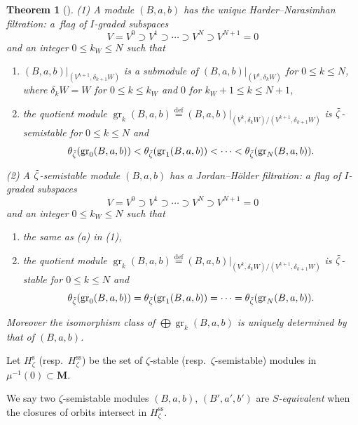 \documentclass[pdftex]{sigma}
\newenvironment{aenume}{%
  \begin{enumerate}%
  \renewcommand{\theenumi}{\alph{enumi}}%
  \renewcommand{\labelenumi}{\textup{(\theenumi)}}%
  }{\end{enumerate}}
\newtheorem{Theorem}[equation]{Theorem}
\theoremstyle{definition}
\numberwithin{equation}{section}
\newcommand{\defeq}{\overset{\operatorname{\scriptstyle def}}{=}}
\newcommand{\bM}{{\mathbf M}} %
\newcommand{\gr}{\operatorname{gr}} %
\begin{document}
\begin{Theorem}[\cite{Rudakov}]\label{thm:Rudakov}
\textup{(1)} A module $(B,a,b)$ has the unique Harder--Narasimhan
filtration\textup:
a~flag of $I$-graded subspaces
\begin{equation*}
  V = V^0 \supset V^1 \supset \cdots \supset V^N \supset V^{N+1} = 0
\end{equation*}
and an integer $0 \le k_W \le N$ such that
\begin{aenume}\itemsep=0pt
\item $(B,a,b)|_{(V^{k+1}, \delta_{k+1} W)}$ is a submodule of
  $(B,a,b)|_{(V^k,\delta_k W)}$ for $0\le k \le N$,
where $\delta_k W = W$ for $0\le k\le k_W$ and $0$
for $k_W + 1\le k \le N+1$,

\item the quotient module $\gr_k (B,a,b) \defeq
  (B,a,b)|_{(V^k,\delta_k W)/(V^{k+1},\delta_{k+1} W)}$ is
  $\Tilde\zeta$-semistable for $0\le k\le N$ and
\[
    \theta_{\Tilde\zeta}(\gr_0(B,a,b))
    < \theta_{\Tilde\zeta}(\gr_1(B,a,b)) < \cdots
    < \theta_{\Tilde\zeta}(\gr_N(B,a,b)).
\]
\end{aenume}

\textup{(2)} A $\Tilde\zeta$-semistable module $(B,a,b)$ has a
Jordan--H\"older filtration\textup:
a f\/lag of $I$-graded subspaces
\begin{equation*}
  V = V^0 \supset V^1 \supset \cdots \supset V^N \supset V^{N+1} = 0
\end{equation*}
and an integer $0 \le k_W \le N$ such that
\begin{aenume}\itemsep=0pt
\item the same as \textup{(a)} in \textup{(1)},

\item the quotient module $\gr_k (B,a,b)\defeq (B,a,b)|_{(V^k,\delta_k
    W)/(V^{k+1},\delta_{k+1} W)}$ is $\Tilde\zeta$-stable for $0\le
  k\le N$ and
\[
    \theta_{\Tilde\zeta}(\gr_0(B,a,b))
    = \theta_{\Tilde\zeta}(\gr_1(B,a,b)) = \cdots
    = \theta_{\Tilde\zeta}(\gr_N(B,a,b)).
\]
\end{aenume}
Moreover the isomorphism class of $\bigoplus \gr_k(B,a,b)$ is uniquely
determined by that of $(B,a,b)$.
\end{Theorem}

Let $H_{\zeta}^{\operatorname{s}}$ (resp.\
$H_{\zeta}^{\operatorname{ss}}$) be the set of
$\zeta$-stable (resp.\ $\zeta$-semistable) modules in
$\mu^{-1}(0)\subset\bM$.

We say two $\zeta$-semistable modules $(B,a,b)$, $(B',a',b')$
are {\it $S$-equivalent\/} when the closures of orbits intersect in
$H_{\zeta}^{\operatorname{ss}}$.
\end{document}

